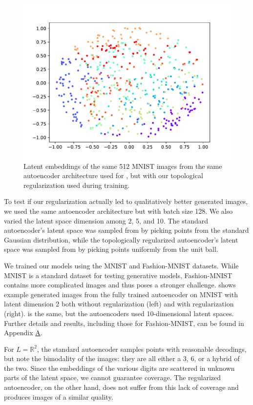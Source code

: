 \documentclass[conference]{IEEEtran}
\newcommand{\R}{\mathbb{R}}
\begin{document}
\begin{figure}[H]
	\centering
	\includegraphics[scale=0.5]{fig/good-latent.pdf}
	\caption{Latent embeddings of the same 512 MNIST images from the same autoencoder architecture used for , but with our topological regularization used during training.}
	\label{good-latent}
\end{figure}

To test if our regularization actually led to qualitatively better generated images, we used the same autoencoder architecture but with batch size 128. We also varied the latent space dimension among 2, 5, and 10. The standard autoencoder's latent space was sampled from by picking points from the standard Gaussian distribution, while the topologically regularized autoencoder's latent space was sampled from by picking points uniformly from the unit ball.

We trained our models using the MNIST and Fashion-MNIST datasets. While MNIST is a standard dataset for testing generative models, Fashion-MNIST contains more complicated images and thus poses a stronger challenge.  shows example generated images from the fully trained autoencoder on MNIST with latent dimension 2 both without regularization (left) and with regularization (right).  is the same, but the autoencoders used 10-dimensional latent spaces. Further details and results, including those for Fashion-MNIST, can be found in Appendix \hyperref[experiment-details]{A}.

For $L=\R^2$, the standard autoencoder samples points with reasonable decodings, but note the bimodality of the images: they are all either a 3, 6, or a hybrid of the two. Since the embeddings of the various digits are scattered in unknown parts of the latent space, we cannot guarantee coverage. The regularized autoencoder, on the other hand, does not suffer from this lack of coverage and produces images of a similar quality.
\end{document}
